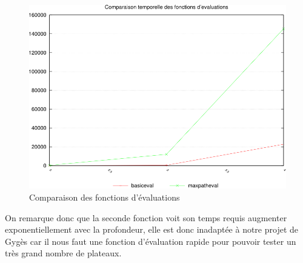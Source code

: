 \documentclass[a4paper]{article}
\begin{document}
	\begin{figure}[h]
		\centering
		\includegraphics[width=\textwidth]{compaFonction.png}
		\caption{Comparaison des fonctions d'évaluations}
		\label{fig:plateau_de_gyges}
	\end{figure}

	On remarque donc que la seconde fonction voit son temps requis augmenter exponentiellement avec la profondeur, elle
	est donc inadaptée à notre projet de Gygès car il nous faut une fonction d'évaluation rapide pour pouvoir tester
	un très grand nombre de plateaux.
\end{document}
